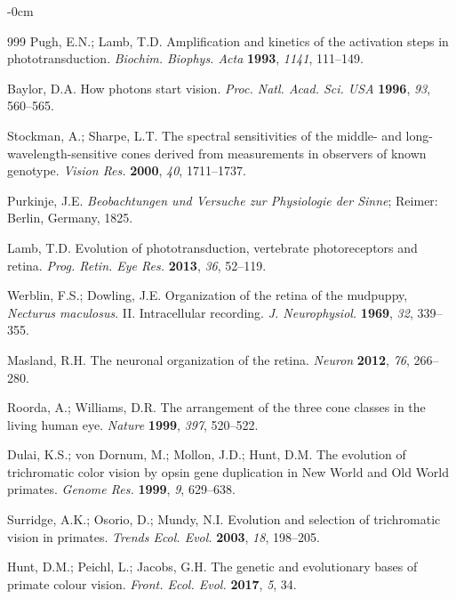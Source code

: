 \documentclass[brainsci,article,submit,moreauthors]{Definitions/mdpi}
\begin{document}
\begin{adjustwidth}{-\extralength}{0cm}
\begin{thebibliography}{999}
Pugh, E.N.; Lamb, T.D. Amplification and kinetics of the activation steps in phototransduction. \textit{Biochim. Biophys. Acta} \textbf{1993}, \textit{1141}, 111--149.

Baylor, D.A. How photons start vision. \textit{Proc. Natl. Acad. Sci. USA} \textbf{1996}, \textit{93}, 560--565.

Stockman, A.; Sharpe, L.T. The spectral sensitivities of the middle- and long-wavelength-sensitive cones derived from measurements in observers of known genotype. \textit{Vision Res.} \textbf{2000}, \textit{40}, 1711--1737.

Purkinje, J.E. \textit{Beobachtungen und Versuche zur Physiologie der Sinne}; Reimer: Berlin, Germany, 1825.

Lamb, T.D. Evolution of phototransduction, vertebrate photoreceptors and retina. \textit{Prog. Retin. Eye Res.} \textbf{2013}, \textit{36}, 52--119.

Werblin, F.S.; Dowling, J.E. Organization of the retina of the mudpuppy, \textit{Necturus maculosus}. II. Intracellular recording. \textit{J. Neurophysiol.} \textbf{1969}, \textit{32}, 339--355.

Masland, R.H. The neuronal organization of the retina. \textit{Neuron} \textbf{2012}, \textit{76}, 266--280.

Roorda, A.; Williams, D.R. The arrangement of the three cone classes in the living human eye. \textit{Nature} \textbf{1999}, \textit{397}, 520--522.

Dulai, K.S.; von Dornum, M.; Mollon, J.D.; Hunt, D.M. The evolution of trichromatic color vision by opsin gene duplication in New World and Old World primates. \textit{Genome Res.} \textbf{1999}, \textit{9}, 629--638.

Surridge, A.K.; Osorio, D.; Mundy, N.I. Evolution and selection of trichromatic vision in primates. \textit{Trends Ecol. Evol.} \textbf{2003}, \textit{18}, 198--205.

Hunt, D.M.; Peichl, L.; Jacobs, G.H. The genetic and evolutionary bases of primate colour vision. \textit{Front. Ecol. Evol.} \textbf{2017}, \textit{5}, 34.


\end{thebibliography}
\end{adjustwidth}
\end{document}
